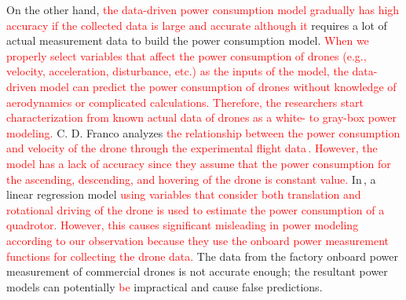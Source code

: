 \documentclass[journal]{./template/IEEEtran}
\begin{document}
On the other hand, \textcolor{red}{the data-driven power consumption model gradually has high accuracy if the collected data is large and accurate although it} requires a lot of actual measurement data to build the power consumption model. 
\textcolor{red}{When we properly select variables that affect the power consumption of drones (e.g., velocity, acceleration, disturbance, etc.) as the inputs of the model, the data-driven model can predict the power consumption of drones without knowledge of aerodynamics or complicated calculations.
Therefore, the researchers start characterization from known actual data of drones as a white- to gray-box power modeling.}
C. D. Franco analyzes \textcolor{red}{the relationship between the power consumption and velocity of the drone through the experimental flight data\,\cite{ref_8}. 
However, the model has a lack of accuracy since they assume that the power consumption for the ascending, descending, and hovering of the drone is constant value.}
In\,\cite{ref_9}, a linear regression model \textcolor{red}{using variables that consider both translation and rotational driving of the drone is used to estimate the power consumption of a quadrotor. 
However, this causes significant misleading in power modeling according to our observation because they use the onboard power measurement functions for collecting the drone data.}
The data from the factory onboard power measurement of commercial drones is not accurate enough; the resultant power models can potentially \textcolor{red}{be} impractical and cause false predictions.
\end{document}
